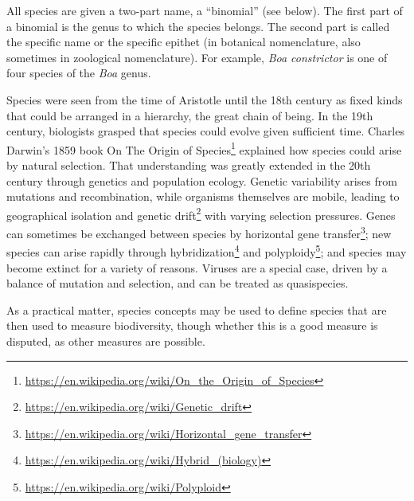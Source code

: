 \documentclass[]{book}
\let\rmarkdownfootnote\footnote%
\def\footnote{\protect\rmarkdownfootnote}
\renewcommand{\href}[2]{#2\footnote{\url{#1}}}
\theoremstyle{definition}
\theoremstyle{definition}
\theoremstyle{definition}
\theoremstyle{remark}
\begin{document}
All species are given a two-part name, a ``binomial'' (see below). The
first part of a binomial is the genus to which the species belongs. The
second part is called the specific name or the specific epithet (in
botanical nomenclature, also sometimes in zoological nomenclature). For
example, \emph{Boa constrictor} is one of four species of the \emph{Boa} genus.

Species were seen from the time of Aristotle until the 18th century as
fixed kinds that could be arranged in a hierarchy, the great chain of
being. In the 19th century, biologists grasped that species could evolve
given sufficient time. Charles Darwin's 1859 book \href{https://en.wikipedia.org/wiki/On_the_Origin_of_Species}{On The Origin of Species}
explained how species could arise by natural selection. That
understanding was greatly extended in the 20th century through genetics
and population ecology. Genetic variability arises from mutations and
recombination, while organisms themselves are mobile, leading to
geographical isolation and \href{https://en.wikipedia.org/wiki/Genetic_drift}{genetic drift} with varying selection
pressures. Genes can sometimes be exchanged between species by
\href{https://en.wikipedia.org/wiki/Horizontal_gene_transfer}{horizontal gene transfer}; new species can arise rapidly through
\href{https://en.wikipedia.org/wiki/Hybrid_(biology)}{hybridization} and \href{https://en.wikipedia.org/wiki/Polyploid}{polyploidy}; and species may become extinct for a
variety of reasons. Viruses are a special case, driven by a balance of
mutation and selection, and can be treated as quasispecies.

As a practical matter, species concepts may be used to define species
that are then used to measure biodiversity, though whether this is a
good measure is disputed, as other measures are possible.
\end{document}
